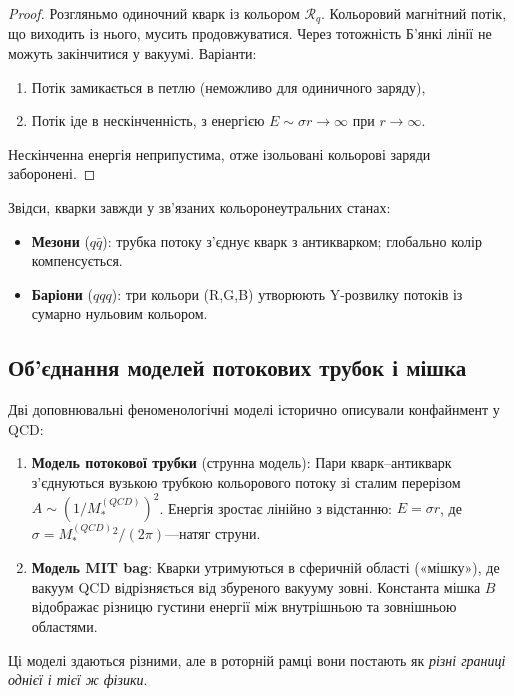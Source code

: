 \documentclass[11pt,a4paper]{article}
\newcommand{\Rotor}{\mathcal{R}}
\theoremstyle{definition}
\theoremstyle{plain}
\theoremstyle{remark}
\begin{document}
\begin{proof}
Розгляньмо одиночний кварк із кольором $\Rotor_q$. Кольоровий магнітний потік, що виходить із нього, мусить продовжуватися. Через тотожність Б’янкі лінії не можуть закінчитися у вакуумі. Варіанти:
\begin{enumerate}
  \item Потік замикається в петлю (неможливо для одиничного заряду),
  \item Потік іде в нескінченність, з енергією $E\sim\sigma r\to\infty$ при $r\to\infty$.
\end{enumerate}
Нескінченна енергія неприпустима, отже ізольовані кольорові заряди заборонені.
\end{proof}

Звідси, кварки завжди у зв’язаних кольоронеутральних станах:
\begin{itemize}[leftmargin=*,itemsep=3pt]
  \item \textbf{Мезони} ($q\bar{q}$): трубка потоку з’єднує кварк з антикварком; глобально колір компенсується.
  \item \textbf{Баріони} ($qqq$): три кольори (R,G,B) утворюють Y-розвилку потоків із сумарно нульовим кольором.
\end{itemize}

\subsection{Об'єднання моделей потокових трубок і мішка}

Дві доповнювальні феноменологічні моделі історично описували конфайнмент у QCD:

\begin{enumerate}
  \item \textbf{Модель потокової трубки} (струнна модель): Пари кварк–антикварк з'єднуються вузькою трубкою кольорового потоку зі сталим перерізом $A \sim (1/M_*^{(QCD)})^2$. Енергія зростає лінійно з відстанню: $E = \sigma r$, де $\sigma = M_*^{(QCD)} {}^2 /(2\pi)$—натяг струни.

  \item \textbf{Модель MIT bag}: Кварки утримуються в сферичній області («мішку»), де вакуум QCD відрізняється від збуреного вакууму зовні. Константа мішка $B$ відображає різницю густини енергії між внутрішньою та зовнішньою областями.
\end{enumerate}

Ці моделі здаються різними, але в роторній рамці вони постають як \emph{різні границі однієї і тієї ж фізики}.
\end{document}
